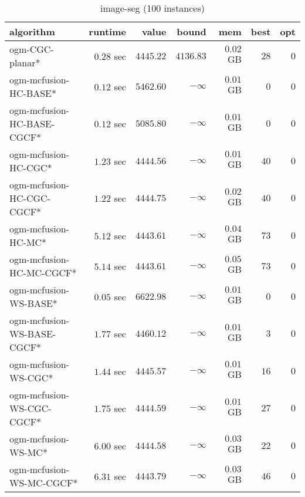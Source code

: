 \begin{table}[H]
\tiny
\centering
\caption{image-seg (100 instances)}
\label{tab:smalltable-image-seg}
\begin{tabular}{lrrrrrr}
\toprule
           algorithm &       runtime     &         value &         bound &           mem &     best &      opt   \\ \midrule 
     ogm-CGC-planar* & $         0.28$ sec & $      4445.22$ & $      4136.83$ & $         0.02$ GB & $      28$ & $       0$ \\ 
ogm-mcfusion-HC-BASE* & $         0.12$ sec & $      5462.60$ & $-\infty$ & $         0.01$ GB & $       0$ & $       0$ \\ 
ogm-mcfusion-HC-BASE-CGCF* & $         0.12$ sec & $      5085.80$ & $-\infty$ & $         0.01$ GB & $       0$ & $       0$ \\ 
ogm-mcfusion-HC-CGC* & $         1.23$ sec & $      4444.56$ & $-\infty$ & $         0.01$ GB & $      40$ & $       0$ \\ 
ogm-mcfusion-HC-CGC-CGCF* & $         1.22$ sec & $      4444.75$ & $-\infty$ & $         0.02$ GB & $      40$ & $       0$ \\ 
 ogm-mcfusion-HC-MC* & $         5.12$ sec & $      4443.61$ & $-\infty$ & $         0.04$ GB & $      73$ & $       0$ \\ 
ogm-mcfusion-HC-MC-CGCF* & $         5.14$ sec & $      4443.61$ & $-\infty$ & $         0.05$ GB & $      73$ & $       0$ \\ 
ogm-mcfusion-WS-BASE* & $         0.05$ sec & $      6622.98$ & $-\infty$ & $         0.01$ GB & $       0$ & $       0$ \\ 
ogm-mcfusion-WS-BASE-CGCF* & $         1.77$ sec & $      4460.12$ & $-\infty$ & $         0.01$ GB & $       3$ & $       0$ \\ 
ogm-mcfusion-WS-CGC* & $         1.44$ sec & $      4445.57$ & $-\infty$ & $         0.01$ GB & $      16$ & $       0$ \\ 
ogm-mcfusion-WS-CGC-CGCF* & $         1.75$ sec & $      4444.59$ & $-\infty$ & $         0.01$ GB & $      27$ & $       0$ \\ 
 ogm-mcfusion-WS-MC* & $         6.00$ sec & $      4444.58$ & $-\infty$ & $         0.03$ GB & $      22$ & $       0$ \\ 
ogm-mcfusion-WS-MC-CGCF* & $         6.31$ sec & $      4443.79$ & $-\infty$ & $         0.03$ GB & $      46$ & $       0$ \\ 
\bottomrule
\end{tabular}
\end{table}